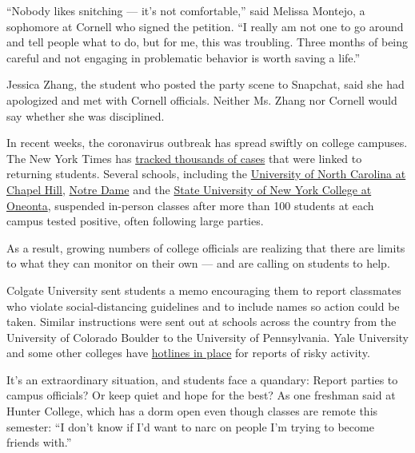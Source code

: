 ``Nobody likes snitching --- it's not comfortable,'' said Melissa
Montejo, a sophomore at Cornell who signed the petition. ``I really am
not one to go around and tell people what to do, but for me, this was
troubling. Three months of being careful and not engaging in problematic
behavior is worth saving a life.''

Jessica Zhang, the student who posted the party scene to Snapchat, said
she had apologized and met with Cornell officials. Neither Ms. Zhang nor
Cornell would say whether she was disciplined.

In recent weeks, the coronavirus outbreak has spread swiftly on college
campuses. The New York Times has
\href{https://www.nytimes3xbfgragh.onion/interactive/2020/us/covid-college-cases-tracker.html}{tracked
thousands of cases} that were linked to returning students. Several
schools, including the
\href{https://www.nytimes3xbfgragh.onion/2020/08/17/us/unc-chapel-hill-covid.html}{University
of North Carolina at Chapel Hill},
\href{https://www.nytimes3xbfgragh.onion/2020/08/18/us/notre-dame-coronavirus.html}{Notre
Dame} and the
\href{https://www.nbcnewyork.com/news/local/state-shuts-down-suny-oneonta-for-2-weeks-after-105-test-positive-for-virus/2593007/}{State
University of New York College at Oneonta}, suspended in-person classes
after more than 100 students at each campus tested positive, often
following large parties.

As a result, growing numbers of college officials are realizing that
there are limits to what they can monitor on their own --- and are
calling on students to help.

Colgate University sent students a memo encouraging them to report
classmates who violate social-distancing guidelines and to include names
so action could be taken. Similar instructions were sent out at schools
across the country from the University of Colorado Boulder to the
University of Pennsylvania. Yale University and some other colleges have
\href{https://your.yale.edu/work-yale/financial-management/university-auditing-quality-assurance/yale-university-hotline/hotline}{hotlines
in place} for reports of risky activity.

It's an extraordinary situation, and students face a quandary: Report
parties to campus officials? Or keep quiet and hope for the best? As one
freshman said at Hunter College, which has a dorm open even though
classes are remote this semester: ``I don't know if I'd want to narc on
people I'm trying to become friends with.''

